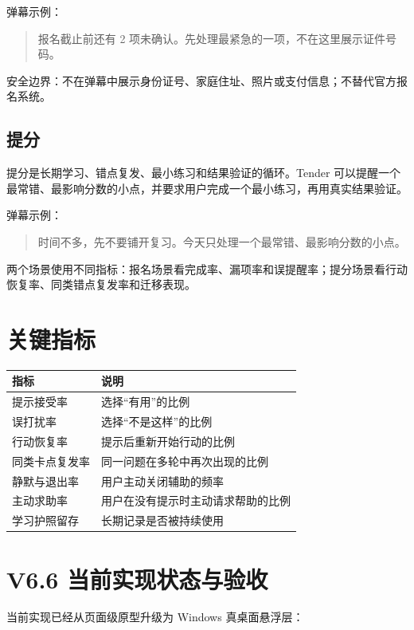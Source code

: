 \documentclass[UTF8,a4paper,11pt]{ctexart}
\begin{document}
弹幕示例：

\begin{quote}
报名截止前还有 2 项未确认。先处理最紧急的一项，不在这里展示证件号码。
\end{quote}

安全边界：不在弹幕中展示身份证号、家庭住址、照片或支付信息；不替代官方报名系统。

\subsection{提分}

提分是长期学习、错点复发、最小练习和结果验证的循环。Tender 可以提醒一个最常错、最影响分数的小点，并要求用户完成一个最小练习，再用真实结果验证。

弹幕示例：

\begin{quote}
时间不多，先不要铺开复习。今天只处理一个最常错、最影响分数的小点。
\end{quote}

两个场景使用不同指标：报名场景看完成率、漏项率和误提醒率；提分场景看行动恢复率、同类错点复发率和迁移表现。

\section{关键指标}

\begin{longtable}{@{}p{5.0cm}p{7.0cm}@{}}
\toprule
指标 & 说明 \\
\midrule
提示接受率 & 选择“有用”的比例 \\
误打扰率 & 选择“不是这样”的比例 \\
行动恢复率 & 提示后重新开始行动的比例 \\
同类卡点复发率 & 同一问题在多轮中再次出现的比例 \\
静默与退出率 & 用户主动关闭辅助的频率 \\
主动求助率 & 用户在没有提示时主动请求帮助的比例 \\
学习护照留存 & 长期记录是否被持续使用 \\
\bottomrule
\end{longtable}

\section{V6.6 当前实现状态与验收}

当前实现已经从页面级原型升级为 Windows 真桌面悬浮层：
\end{document}
